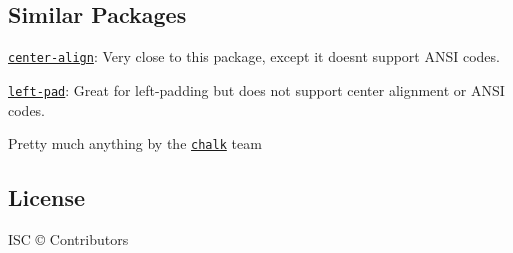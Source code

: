 \subsection*{Similar Packages}


\begin{DoxyItemize}
\item \href{https://github.com/jonschlinkert/center-align}{\tt {\ttfamily center-\/align}}\+: Very close to this package, except it doesn\textquotesingle{}t support A\+N\+SI codes.
\item \href{https://github.com/camwest/left-pad}{\tt {\ttfamily left-\/pad}}\+: Great for left-\/padding but does not support center alignment or A\+N\+SI codes.
\item Pretty much anything by the \href{https://github.com/chalk}{\tt chalk} team
\end{DoxyItemize}

\subsection*{License}

I\+SC © Contributors 